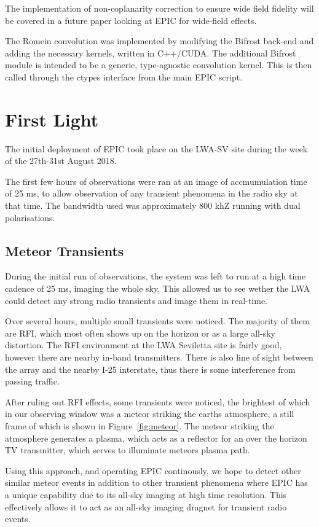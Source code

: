 \documentclass[bibliography=totocnumbered, twocolumn]{article}
\begin{document}
The implementation of non-coplanarity correction to ensure
wide field fidelity will be covered in a future paper looking
at EPIC for wide-field effects.

The Romein convolution was implemented by modifying the Bifrost
back-end and adding the necessary kernels, written in C++/CUDA. The
additional Bifrost module is intended to be a generic, type-agnostic
convolution kernel. This is then called through the ctypes interface
from the main EPIC script.

\section{First Light} \label{sec:firstlight}

The initial deployment of EPIC took place on the LWA-SV site
during the week of the 27th-31st August 2018.

The first few hours of observations were ran at an image of
accmumulation time of 25 ms, to allow observation of any
transient phenomena in the radio sky at that time. The bandwidth
used was approximately 800 khZ running with dual polarisations. 

\subsection{Meteor Transients}

During the initial run of observations, the system was left to
run at a high time cadence of 25 ms, imaging the whole sky. This
allowed us to see wether the LWA could detect any strong radio
transients and image them in real-time.

Over several hours, multiple small transients were noticed. The
majority of them are RFI, which most often shows up on the horizon
or as a large all-sky distortion. The RFI environment at the LWA
Seviletta site is fairly good, however there are nearby in-band
transmitters. There is also line of sight between the array and
the nearby I-25 interstate, thus there is some interference from
passing traffic.

After ruling out RFI effects, some transients were noticed, the
brightest of which in our observing window was a meteor striking
the earths atmosphere, a still frame of which is shown in Figure~\ref{fig:meteor}.
The meteor striking the atmosphere generates a plasma, which acts
as a reflector for an over the horizon TV transmitter, which
serves to illuminate meteors plasma path.

Using this approach, and operating EPIC continously, we hope to
detect other similar meteor events in addition to other
transient phenomena where EPIC has a unique capability due to
its all-sky imaging at high time resolution. This effectively
allows it to act as an all-sky imaging dragnet for transient radio
events. 
\end{document}

